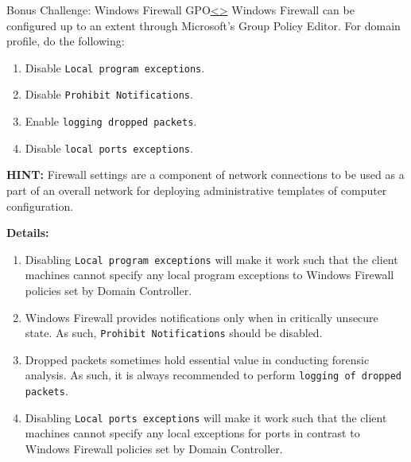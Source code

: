 \documentclass[12pt]{extarticle}
\newenvironment{instructionblock}{\Large\bgroup}{\egroup}
\begin{document}


\pagebreak
\begin{slide}{Bonus Challenge: Windows Firewall GPO}{\hyperref[slide 21]{\textless}\hyperref[slide 23]{\textgreater}}
\vskip 5pt
\begin{instructionblock}
Windows Firewall can be configured up to an extent through Microsoft's Group Policy Editor. For domain profile, do the following:
\begin{enumerate}
\item Disable \texttt{Local program exceptions}.
\item Disable \texttt{Prohibit Notifications}.
\item Enable \texttt{logging dropped packets}.
\item Disable \texttt{local ports exceptions}.
\end{enumerate}
\end{instructionblock}
\end{slide}

\noindent
\textbf{HINT:} Firewall settings are a component of network connections to be used as a part of an overall network for deploying administrative templates of computer configuration.

\vspace{6mm}
\noindent
\textbf{Details:}

\begin{enumerate}
\item { Disabling \texttt{Local program exceptions} will make it work such that the client machines cannot specify any local program exceptions to Windows Firewall policies set by Domain Controller.}
\item { Windows Firewall provides notifications only when in critically unsecure state. As such, \texttt{Prohibit Notifications} should be disabled.}
\item { Dropped packets sometimes hold essential value in conducting forensic analysis. As such, it is always recommended to perform \texttt{logging of dropped packets}. }
\item {Disabling \texttt{Local ports exceptions} will make it work such that the client machines cannot specify any local exceptions for ports in contrast to Windows Firewall policies set by Domain Controller. }
\end{enumerate}
\end{document}
